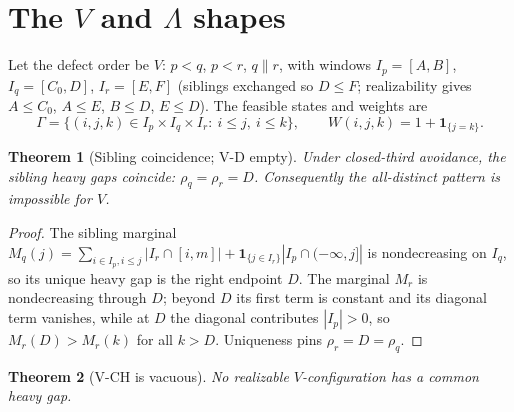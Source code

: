 \documentclass[11pt]{article}
\newtheorem{theorem}{Theorem}[section]
\theoremstyle{definition}
\theoremstyle{remark}
\begin{document}
\section{The $V$ and $\Lambda$ shapes}\label{sec:vlambda}
Let the defect order be $V$: $p<q$, $p<r$, $q\parallel r$, with windows
$I_p=[A,B]$, $I_q=[C_0,D]$, $I_r=[E,F]$ (siblings exchanged so $D\le F$; realizability
gives $A\le C_0$, $A\le E$, $B\le D$, $E\le D$). The feasible states and
weights are
\[
\Gamma=\{(i,j,k)\in I_p\times I_q\times I_r:\ i\le j,\ i\le k\},\qquad
W(i,j,k)=1+\mathbf1_{\{j=k\}} .
\]

\begin{theorem}[Sibling coincidence; V-D empty]\label{thm:vd}
Under closed-third avoidance, the sibling heavy gaps coincide: $\rho_q=\rho_r=D$.
Consequently the all-distinct pattern is impossible for $V$.
\end{theorem}

\begin{proof}
The sibling marginal $M_q(j)=\sum_{i\in I_p,i\le j}|I_r\cap[i,m]|
+\mathbf1_{\{j\in I_r\}}|I_p\cap(-\infty,j]|$ is nondecreasing on $I_q$, so its unique
heavy gap is the right endpoint $D$. The marginal $M_r$ is nondecreasing through $D$;
beyond $D$ its first term is constant and its diagonal term vanishes, while at $D$ the
diagonal contributes $|I_p|>0$, so $M_r(D)>M_r(k)$ for all $k>D$. Uniqueness pins
$\rho_r=D=\rho_q$.
\end{proof}

\begin{theorem}[V-CH is vacuous]\label{thm:vch}
No realizable $V$-configuration has a common heavy gap.
\end{theorem}
\end{document}

